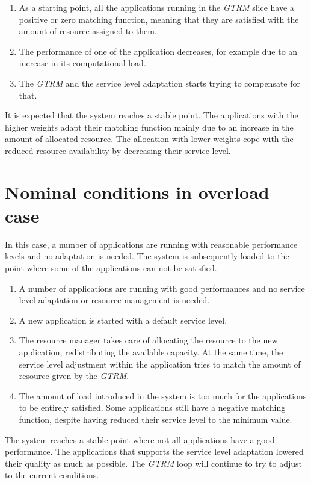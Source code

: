 \documentclass[nobiblatex]{LTHthesis}
\begin{document}
\begin{enumerate}
\item As a starting point, all the applications running in the \emph{GTRM} slice
  have a positive or zero matching function, meaning that they are satisfied
  with the amount of resource assigned to them.
\item The performance of one of the application decreases, for example due to
  an increase in its computational load.
\item The \emph{GTRM} and the service level adaptation starts trying to compensate
  for that.
\end{enumerate}


It is expected that the system reaches a stable point. The applications with
the higher weights adapt their matching function mainly due to an increase
in the amount of allocated resource. The allocation with lower weights cope
with the reduced resource availability by decreasing their service level.

\section{Nominal conditions in overload case}

In this case, a number of applications are running with reasonable
performance levels and no adaptation is needed. The system is subsequently
loaded to the point where some of the applications can not be satisfied.

\begin{enumerate}
\item A number of applications are running with good performances and 
  no service level adaptation or resource management is needed.
\item A new application is started with a default service level.
\item The resource manager takes care of allocating the resource to the
  new application, redistributing the available capacity. At the same
  time, the service level adjustment within the application tries to match
  the amount of resource given by the \emph{GTRM}.
\item The amount of load introduced in the system is too much for the
  applications to be entirely satisfied. Some applications still have a 
  negative matching function, despite having reduced their service
  level to the minimum value.
\end{enumerate}

The system reaches a stable point where not all applications have a good
performance. The applications that supports the service level adaptation 
lowered their quality as much as possible. The \emph{GTRM} loop will continue to
try to adjust to the current conditions.
\end{document}
